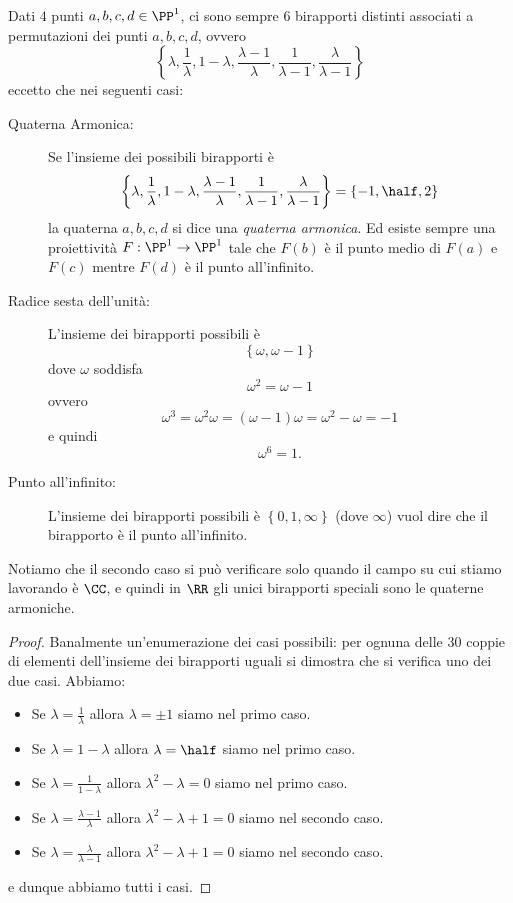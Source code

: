 \documentclass[11pt]{scrartcl}
\begin{document}
   	 \begin{proposition}
   	 	Dati $4$ punti $a,b,c,d\in \PP^1$, ci sono sempre $6$ birapporti distinti associati a permutazioni dei punti $a,b,c,d$, ovvero
   	 	$$\left\{\lambda,\frac{1}{\lambda},1-\lambda,\frac{\lambda-1}{\lambda},\frac{1}{\lambda-1},\frac{\lambda}{\lambda-1}\right\}$$
   	 	eccetto che nei seguenti casi:
   	 	\begin{description}
   	 		\item[Quaterna Armonica:] Se l'insieme dei possibili birapporti è 
   	 		$$\left\{\lambda,\frac{1}{\lambda},1-\lambda,\frac{\lambda-1}{\lambda},\frac{1}{\lambda-1},\frac{\lambda}{\lambda-1}\right\}=\left\{-1,\half,2\right\}$$
   	 		la quaterna $a,b,c,d$ si dice una \textit{quaterna armonica}. Ed esiste sempre una proiettività $F:\PP^1\to\PP^1$ tale che $F(b)$ è il punto medio di $F(a)$ e $F(c)$ mentre $F(d)$ è il punto all'infinito.
   	 		\item[Radice sesta dell'unità:] L'insieme dei birapporti possibili è
   	 		$$\left\{\omega,\omega-1\right\}$$
   	 		dove $\omega$ soddisfa 
   	 		$$\omega^2=\omega-1$$
   	 		ovvero 
   	 		$$\omega^3=\omega^2\omega=\left(\omega-1\right)\omega=\omega^2-\omega=-1$$
   	 		e quindi
   	 		$$\omega^6=1.$$
   	 		\item[Punto all'infinito:] L'insieme dei birapporti possibili è $\left\{0,1,\infty\right\}$ (dove $\infty$) vuol dire che il birapporto è il punto all'infinito.
   	 	\end{description}
   	 	Notiamo che il secondo caso si può verificare solo quando il campo su cui stiamo lavorando è $\CC$, e quindi in $\RR$ gli unici birapporti speciali sono le quaterne armoniche.
   	 \end{proposition}
   	 \begin{proof}
   	 	Banalmente un'enumerazione dei casi possibili: per ognuna delle $30$ coppie di elementi dell'insieme dei birapporti uguali si dimostra che si verifica uno dei due casi. Abbiamo:
   	 	\begin{itemize}
   	 		\item Se $\lambda=\frac{1}{\lambda}$ allora $\lambda=\pm 1$ siamo nel primo caso.
   	 		\item Se $\lambda=1-\lambda$ allora $\lambda=\half$ siamo nel primo caso.
   	 		\item Se $\lambda=\frac{1}{1-\lambda}$ allora $\lambda^2-\lambda=0$ siamo nel primo caso.
   	 		\item Se $\lambda=\frac{\lambda-1}{\lambda}$ allora $\lambda^2-\lambda+1=0$ siamo nel secondo caso.
   	 		\item Se $\lambda=\frac{\lambda}{\lambda-1}$ allora $\lambda^2-\lambda+1=0$ siamo nel secondo caso.
   	 	\end{itemize}
   	 	e dunque abbiamo tutti i casi.
   	 \end{proof}
   	 
\end{document}
